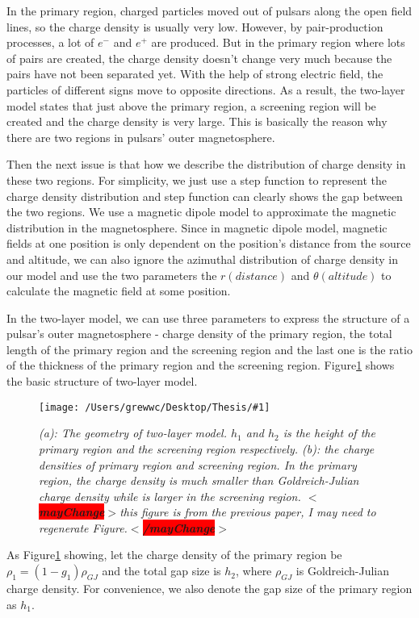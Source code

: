 \documentclass[12pt]{report}
\newcommand{\mycaption}[1]{\caption{\textit{\footnotesize #1}}}
\newcommand{\singleFig}[3]{
 \begin{figure}[!ht]
  \centering
  \texttt{[image: /Users/grewwc/Desktop/Thesis/\#1]}
  \mycaption{#3}
 \label{fig: #1}
 \end{figure}
}
\newcommand{\mayChange}[1]{
  $<$\colorbox{red}{\textbf{mayChange}}$>$#1$<$\colorbox{red}{\textbf{/mayChange}}$>$
}
\newcommand{\myComment}[1]{
  \newline
}
\begin{document}
      In the primary region, charged particles moved out of pulsars along the open field lines, 
      so the charge density is usually very low. 
      However, by pair-production processes, a lot of $e^{-}$ and $e^{+}$ are produced. 
      But in the primary region where lots of pairs are created, the charge density doesn't 
      change very much because the pairs have not been separated yet. With the help of strong 
      electric field, the particles of different signs move to opposite directions. 
      As a result, the two-layer model states that just above the primary region, a screening 
      region will be created and the charge density is very large. This is basically the reason why 
      there are two regions in pulsars' outer magnetosphere.

      Then the next issue is that how we describe the distribution of charge density in these two regions. 
      For simplicity, we just use a step function to represent the charge density distribution and step function 
      can clearly shows the gap between the two regions. We use a magnetic dipole model to approximate the 
      magnetic distribution in the magnetosphere. Since in magnetic dipole model, magnetic fields at one 
      position is only dependent on the position's distance from the source and altitude, we can 
      also ignore the azimuthal distribution of charge density in our model and use the two parameters
      the $r (distance)$ and $\theta (altitude)$ to calculate the magnetic field at some position.

      In the two-layer model, we can use three parameters to express the structure of a pulsar's outer 
      magnetosphere - charge density of the primary region, the total length of the primary region and the 
      screening region and the last one is the ratio of the thickness of the primary region and the 
      screening region. Figure\ref{fig: charge_density} shows the basic structure of two-layer model. 

      \singleFig{charge_density}{0.6}{(a): The geometry of two-layer model. $h_{1}$ and $h_{2}$ is the height
      of the primary region and the screening region respectively. (b): the charge densities of primary region and 
      screening region. In the primary region, the charge density is much smaller than Goldreich-Julian charge density
      while is larger in the screening region. \mayChange{this figure is from the previous paper, I may need to 
      regenerate Figure.}}

      As Figure\ref{fig: charge_density} showing, 
      let the charge density of the primary region be $\rho_1 = (1-g_{1}) \rho_{GJ}$ and the total gap size is 
      $h_{2}$, where $\rho_{GJ}$ is Goldreich-Julian charge density. For convenience, 
      we also denote the gap size of the primary region as $h_{1}$. 
      \myComment{Then we can calculate electric potential and electric field by solving the Poisson equation }
\end{document}
